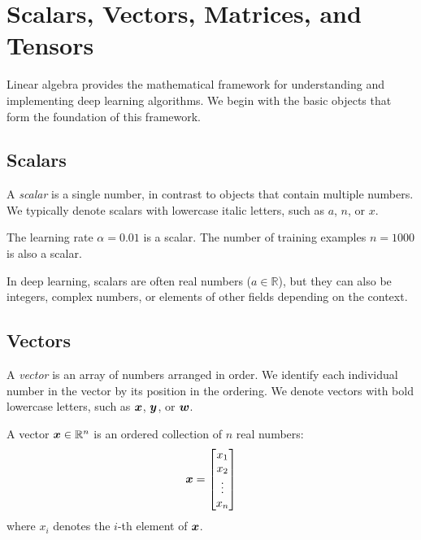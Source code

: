 
\section{Scalars, Vectors, Matrices, and Tensors}
\label{sec:scalars-vectors-matrices-tensors}

Linear algebra provides the mathematical framework for understanding and implementing deep learning algorithms. We begin with the basic objects that form the foundation of this framework.

\subsection{Scalars}

A \emph{scalar} is a single number, in contrast to objects that contain multiple numbers. We typically denote scalars with lowercase italic letters, such as $a$, $n$, or $x$.

\begin{example}
The learning rate $\alpha = 0.01$ is a scalar. The number of training examples $n = 1000$ is also a scalar.
\end{example}

In deep learning, scalars are often real numbers ($a \in \mathbb{R}$), but they can also be integers, complex numbers, or elements of other fields depending on the context.

\subsection{Vectors}

A \emph{vector} is an array of numbers arranged in order. We identify each individual number in the vector by its position in the ordering. We denote vectors with bold lowercase letters, such as $\boldsymbol{x}$, $\boldsymbol{y}$, or $\boldsymbol{w}$.

\begin{definition}[Vector]
A vector $\boldsymbol{x} \in \mathbb{R}^n$ is an ordered collection of $n$ real numbers:
\begin{equation}
    \boldsymbol{x} = \begin{bmatrix} x_1 \\ x_2 \\ \vdots \\ x_n \end{bmatrix}
\end{equation}
where $x_i$ denotes the $i$-th element of $\boldsymbol{x}$.
\end{definition}

